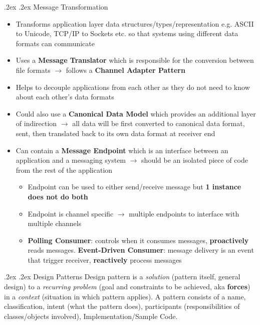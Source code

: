 \documentclass[10pt,landscape,a4paper]{article}
\makeatletter
\renewcommand{\section}{\@startsection{section}{1}{0mm}%
	{.2ex}%
	{.2ex}%
	{\color{myblue}\sffamily\scriptsize\bfseries}}
\renewcommand{\subsubsection}{\@startsection{subsubsection}{1}{0mm}%
	{.2ex}%
	{.2ex}%
	{\rmfamily\bfseries}}
\makeatother
\begin{document}
\begin{multicols*}{4}
		\subsubsection{Message Transformation}
		\begin{itemize}
			\item Transforms application layer data structures/types/representation e.g. ASCII to Unicode, TCP/IP to Sockets etc. so that systems using different data formats can communicate
			\item Uses a \textbf{Message Translator} which is responsible for the conversion between file formats $\rightarrow$ follows a \textbf{Channel Adapter Pattern}
			\item Helps to decouple applications from each other as they do not need to know about each other's data formats
			\item Could also use a \textbf{Canonical Data Model} which provides an additional layer of indirection $\rightarrow$ all data will be first converted to canonical data format, sent, then translated back to its own data format at receiver end
			\item Can contain a \textbf{Message Endpoint} which is an interface between an application and a messaging system $\rightarrow$ should be an isolated piece of code from the rest of the application
			\begin{itemize}
				\item Endpoint can be used to either send/receive message but \textbf{1 instance does not do both}
				\item Endpoint is channel specific $\rightarrow$ multiple endpoints to interface with multiple channels
				\item \textbf{Polling Consumer}: controls when it consumes messages, \textbf{proactively} reads messages. \textbf{Event-Driven Consumer}: message delivery is an event that trigger receiver, \textbf{reactively} process messages
			\end{itemize}
		\end{itemize}
		\section{Design Patterns}
		Design pattern is a \textit{solution} (pattern itself, general design) to a \textit{recurring problem} (goal and constraints to be achieved, aka \textbf{forces}) in a \textit{context} (situation in which pattern applies). A pattern consists of a name, classification, intent (what the pattern does), participants (responsibilities of classes/objects involved), Implementation/Sample Code.

\end{multicols*}
\end{document}
